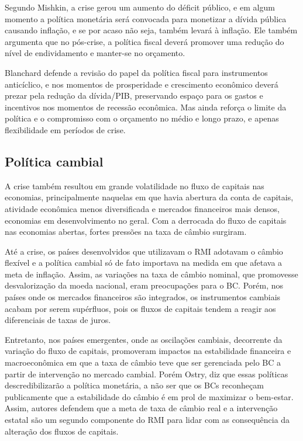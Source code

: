 \documentclass[report]{uftex}
\begin{document}
Segundo Mishkin, a crise gerou um aumento do déficit público, e em algum momento a política monetária será convocada para monetizar a dívida pública causando inflação, e se por acaso não seja, também levará à inflação. Ele também argumenta que no pós-crise, a política fiscal deverá promover uma redução do nível de endividamento e manter-se no orçamento. 

Blanchard defende a revisão do papel da política fiscal para instrumentos anticíclico, e nos momentos de prosperidade e crescimento econômico deverá prezar pela redução da dívida/PIB, preservando espaço para os gastos e incentivos nos momentos de recessão econômica. Mas ainda reforça o limite da política e o compromisso com o orçamento no médio e longo prazo, e apenas flexibilidade em períodos de crise.

\subsection{Política cambial}

A crise também resultou em grande volatilidade no fluxo de capitais nas economias, principalmente naquelas em que havia abertura da conta de capitais, atividade econômica menos diversificada e mercados financeiros mais densos, economias em desenvolvimento no geral. Com a derrocada do fluxo de capitais nas economias abertas, fortes pressões na taxa de câmbio surgiram.

Até a crise, os países desenvolvidos que utilizavam o RMI adotavam o câmbio flexível e a política cambial só de fato importava na medida em que afetava a meta de inflação. Assim, as variações na taxa de câmbio nominal, que promovesse desvalorização da moeda nacional, eram preocupações para o BC. Porém, nos países onde os mercados financeiros são integrados, os instrumentos cambiais acabam por serem supérfluos, pois os fluxos de capitais tendem a reagir aos diferenciais de taxas de juros. 

Entretanto, nos países emergentes, onde as oscilações cambiais, decorrente da variação do fluxo de capitais, promoveram impactos na estabilidade financeira e macroeconômica em que a taxa de câmbio teve que ser gerenciada pelo BC a partir de intervenção no mercado cambial. Porém Ostry, diz que essas políticas descredibilizarão a política monetária, a não ser que os BCs reconheçam publicamente que a estabilidade do câmbio é em prol de maximizar o bem-estar. Assim, autores defendem que a meta de taxa de câmbio real e a intervenção estatal são um segundo componente do RMI para lidar com as consequência da alteração dos fluxos de capitais. 
\end{document}
